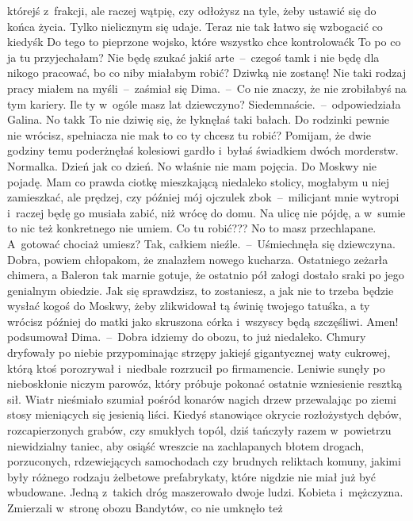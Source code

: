 \documentclass[../MAIN.tex]{subfiles}
\begin{document}
którejś z~frakcji, ale raczej wątpię, czy odłożysz na tyle, żeby ustawić się do
końca życia. Tylko nielicznym się udaje.
Teraz nie tak łatwo się wzbogacić co
kiedyś\3k Do tego to pieprzone wojsko, które wszystko chce kontrolować\3k
\xx  To po co ja tu przyjechałam? Nie będę szukać jakiś arte~--~czegoś tam\3k i
nie będę dla nikogo pracować, bo co niby miałabym robić? Dziwką nie zostanę!
\xx  Nie taki rodzaj pracy miałem na myśli~--~zaśmiał się Dima.~--~Co nie znaczy,
że nie zrobiłabyś na tym kariery. Ile ty w~ogóle masz lat dziewczyno?
\xx  Siedemnaście.~--~odpowiedziała Galina.
\xx  No tak\3k To nie dziwię się, że łyknęłaś taki bałach. Do rodzinki pewnie
nie wrócisz, spełniacza nie ma\3k to co ty chcesz tu robić? Pomijam, że dwie
godziny temu poderżnęłaś kolesiowi gardło i~byłaś świadkiem dwóch morderstw.
Normalka. Dzień jak co dzień.
\xx  No właśnie nie mam pojęcia. Do Moskwy nie pojadę. Mam co prawda ciotkę
mieszkającą niedaleko stolicy, mogłabym u niej zamieszkać, ale prędzej, czy
później mój ojczulek zbok~--~milicjant mnie wytropi i~raczej będę go musiała
zabić, niż wrócę do domu. Na ulicę nie pójdę, a w~sumie to nic też konkretnego
nie umiem. Co tu robić???
\xx  No to masz przechlapane. A~gotować chociaż umiesz?
\xx  Tak, całkiem nieźle.~--~Uśmiechnęła się dziewczyna.
\xx  Dobra, powiem chłopakom, że znalazłem nowego kucharza. Ostatniego zeżarła
chimera, a Baleron tak marnie gotuje, że ostatnio pół załogi dostało sraki po
jego genialnym obiedzie. Jak się sprawdzisz, to zostaniesz, a jak nie to trzeba
będzie wysłać kogoś do Moskwy, żeby zlikwidował tą świnię twojego tatuśka, a ty
wrócisz później do matki jako skruszona córka i~wszyscy będą szczęśliwi. Amen!
podsumował Dima.~--~Dobra idziemy do obozu, to już niedaleko.
\qd
Chmury dryfowały po niebie przypominając strzępy jakiejś gigantycznej waty
cukrowej, któ\-rą ktoś porozrywał i~niedbale rozrzucił po firmamencie. Leniwie
sunęły po nieboskłonie niczym parowóz, który próbuje pokonać ostatnie
wzniesienie resztką sił.
Wiatr nieśmiało szumiał pośród konarów nagich drzew
przewalając po ziemi stosy mieniących się jesienią liści. Kiedyś stanowiące
okrycie rozłożystych dębów, rozcapierzonych grabów, czy smukłych topól, dziś
tańczyły razem w~powietrzu niewidzialny taniec, aby osiąść wreszcie na
zachlapanych błotem drogach, porzuconych, rdzewiejących samochodach czy brudnych
reliktach komuny, jakimi były różnego rodzaju żelbetowe prefabrykaty, które
nigdzie nie miał już być wbudowane.
Jedną z~takich dróg maszerowało dwoje ludzi.
Kobieta i~mężczyzna. Zmierzali w~stronę obozu Bandytów, co nie umknęło też
\end{document}
